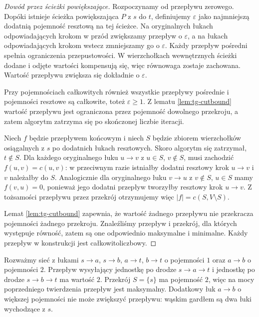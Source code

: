 \begin{proof}[Dowód przez ścieżki powiększające]
Rozpoczynamy od przepływu zerowego. Dopóki istnieje
ścieżka powiększająca $P$ z $s$ do $t$, definiujemy
$\varepsilon$ jako najmniejszą dodatnią pojemność resztową
na tej ścieżce. Na oryginalnych łukach odpowiadających
krokom w przód zwiększamy przepływ o $\varepsilon$,
a na łukach odpowiadających krokom wstecz zmniejszamy
go o $\varepsilon$. Każdy przepływ pośredni spełnia
ograniczenia przepustowości. W wierzchołkach wewnętrznych
ścieżki dodane i odjęte wartości kompensują się,
więc równowaga zostaje zachowana. Wartość przepływu
zwiększa się dokładnie o $\varepsilon$.

Przy pojemnościach całkowitych również wszystkie przepływy
pośrednie i pojemności resztowe są całkowite, toteż
$\varepsilon\ge1$. Z lematu \ref{lem:tg-cutbound}
wartość przepływu jest ograniczona przez pojemność
dowolnego przekroju, a zatem algorytm zatrzyma się
po skończonej liczbie iteracji.

Niech $f$ będzie przepływem końcowym i niech $S$ będzie
zbiorem wierzchołków osiągalnych z $s$ po dodatnich
łukach resztowych. Skoro algorytm się zatrzymał, $t\notin S$.
Dla każdego oryginalnego łuku $u\to v$ z $u\in S$,
$v\notin S$, musi zachodzić $f(u,v)=c(u,v)$:
w przeciwnym razie istniałby dodatni resztowy krok
$u\to v$ i $v$ należałby do $S$.
Analogicznie dla oryginalnego łuku $v\to u$ z $v\notin S$,
$u\in S$ mamy $f(v,u)=0$, ponieważ jego dodatni przepływ
tworzyłby resztowy krok $u\to v$.
Z tożsamości przepływu przez przekrój otrzymujemy więc
$|f|=c(S,V\setminus S)$.

Lemat \ref{lem:tg-cutbound} zapewnia, że wartość żadnego
przepływu nie przekracza pojemności żadnego przekroju.
Znaleźliśmy przepływ i przekrój, dla których występuje
równość, zatem są one odpowiednio maksymalne i minimalne.
Każdy przepływ w konstrukcji jest całkowitoliczbowy.
\end{proof}

\begin{przyklad}
Rozważmy sieć z łukami $s\to a$, $s\to b$, $a\to t$,
$b\to t$ o pojemności $1$ oraz $a\to b$ o pojemności $2$.
Przepływ wysyłający jednostkę po drodze $s\to a\to t$
i jednostkę po drodze $s\to b\to t$ ma wartość $2$.
Przekrój $S=\{s\}$ ma pojemność $2$, więc na mocy
poprzedniego twierdzenia przepływ jest maksymalny.
Dodatkowy łuk $a\to b$ o większej pojemności
nie może zwiększyć przepływu: wąskim gardłem
są dwa łuki wychodzące z $s$.
\end{przyklad}

